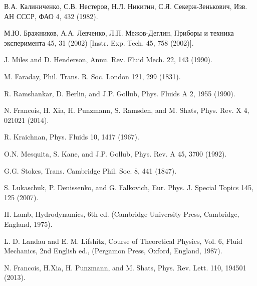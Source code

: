\begin{thebibliography}{99}
В.А. Калиниченко, С.В. Нестеров, Н.Л. Никитин, С.Я. Секерж-Зенькович, Изв. АН СССР, ФАО 4, 432 (1982).

М.Ю. Бражников, А.А. Левченко, Л.П. Межов-Деглин, Приборы и техника эксперимента 45, 31 (2002) [Instr. Exp. Tech. 45, 758 (2002)].

J. Miles and D. Henderson, Annu. Rev. Fluid Mech. 22, 143 (1990).

M. Faraday, Phil. Trans. R. Soc. London 121, 299 (1831).

R. Ramshankar, D. Berlin, and J.P. Gollub, Phys. Fluids A 2, 1955 (1990).


N. Francois, H. Xia, H. Punzmann, S. Ramsden, and M. Shats, Phys. Rev. X 4, 021021 (2014).

R. Kraichnan, Phys. Fluids 10, 1417 (1967).

O.N. Mesquita, S. Kane, and J.P. Gollub, Phys. Rev. A 45, 3700 (1992).

G.G. Stokes, Trans. Cambridge Phil. Soc. 8, 441 (1847).



S. Lukaschuk, P. Denissenko, and G. Falkovich, Eur. Phys. J. Special Topics 145, 125 (2007).


H. Lamb, Hydrodynamics, 6th ed. (Cambridge University Press, Cambridge, England, 1975).

L. D. Landau and E. M. Lifshitz, Course of Theoretical Physics, Vol. 6, Fluid Mechanics, 2nd English ed., (Pergamon Press, Oxford, England, 1987).


N. Francois, H.Xia, H. Punzmann, and M. Shats, Phys. Rev. Lett. 110, 194501 (2013).


\end{thebibliography}
